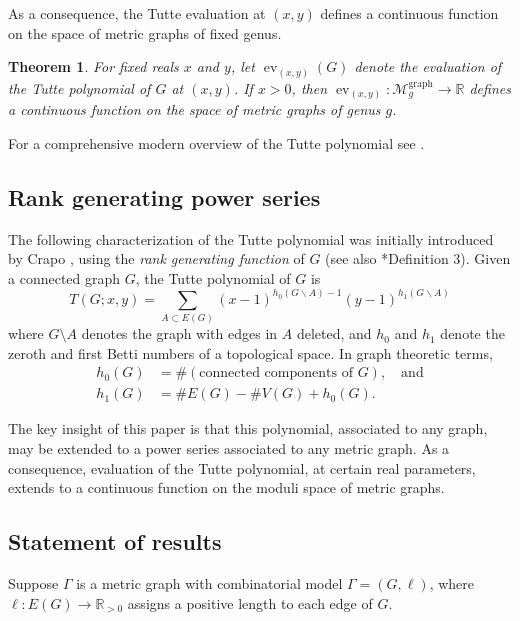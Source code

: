 \documentclass{amsart}
\newtheorem{thm}{Theorem}
\theoremstyle{definition}
\newcommand{\RR}{\mathbb{R}}
\newcommand{\RRpos}{\RR_{>0}}
\DeclareMathOperator{\ev}{ev}
\newcommand{\Mgraphg}{\mathcal M_g^{\mathrm{graph}}}
\begin{document}
As a consequence, the Tutte evaluation at $(x, y)$ defines a continuous function on the space of metric graphs of fixed genus.
\begin{thm}
	For fixed reals $x$ and $y$, let $\ev_{(x, y)}(G)$ denote the evaluation of the Tutte polynomial of $G$ at $(x, y)$.
	If $x > 0$, then $\ev_{(x, y)}: \Mgraphg \to \RR$ defines a continuous function on the space of metric graphs of genus $g$.
\end{thm}

For a comprehensive modern overview of the Tutte polynomial see \cites{BO, EMM}.

\subsection{Rank generating power series}
The following characterization of the Tutte polynomial was initially introduced by Crapo \cite{Cra}, 
using the  {\em rank generating function} of $G$
(see also \cite{EMM}*{Definition 3}).
Given a connected graph $G $, 
the Tutte polynomial of $G$ is 
\begin{equation}
\label{eq:tutte-graph}
T(G; x,y) = \sum_{A \subset E(G)} (x-1)^{h_0(G\backslash A) - 1}(y-1)^{h_1(G\backslash A)}
\end{equation}
where $G\setminus A$ denotes the graph with edges in $A$ deleted,
and $h_0$ and $h_1$ denote the zeroth and first Betti numbers of 
a topological space.
In graph theoretic terms,
\begin{align*}
h_0(G) &= \#(\text{connected components of }G), \quad\text{and}\\
h_1(G) &= \# E(G) - \# V(G) + h_0(G) .
\end{align*}

The key insight of this paper is that this polynomial, associated to any graph, may be extended to a power series associated to any metric graph.
As a consequence, evaluation of the Tutte polynomial, at certain real parameters, extends to a continuous function on the moduli space of metric graphs.

\subsection{Statement of results}
Suppose $\Gamma$ is a metric graph with combinatorial model $\Gamma = (G,\ell)$,
where $\ell : E(G) \to \RRpos$ assigns a positive length to each edge of $G$.
\end{document}
